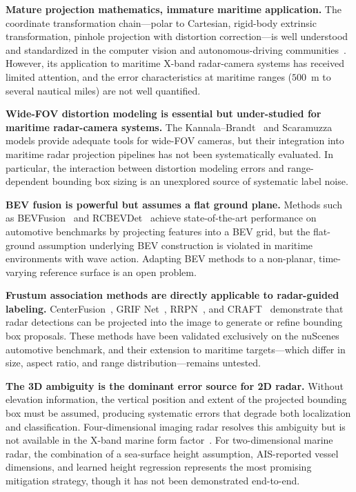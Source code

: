 \textbf{Mature projection mathematics, immature maritime application.} The coordinate transformation chain---polar to Cartesian, rigid-body extrinsic transformation, pinhole projection with distortion correction---is well understood and standardized in the computer vision and autonomous-driving communities~\cite{zhang2000flexible, Caesar2020nuScenes}. However, its application to maritime X-band radar-camera systems has received limited attention, and the error characteristics at maritime ranges ($500$~m to several nautical miles) are not well quantified.

\textbf{Wide-FOV distortion modeling is essential but under-studied for maritime radar-camera systems.} The Kannala--Brandt~\cite{kannala2006generic} and Scaramuzza~\cite{scaramuzza2006toolbox} models provide adequate tools for wide-FOV cameras, but their integration into maritime radar projection pipelines has not been systematically evaluated. In particular, the interaction between distortion modeling errors and range-dependent bounding box sizing is an unexplored source of systematic label noise.

\textbf{BEV fusion is powerful but assumes a flat ground plane.} Methods such as BEVFusion~\cite{liu2023bevfusion} and RCBEVDet~\cite{Lin2024RCBEVDet} achieve state-of-the-art performance on automotive benchmarks by projecting features into a BEV grid, but the flat-ground assumption underlying BEV construction is violated in maritime environments with wave action. Adapting BEV methods to a non-planar, time-varying reference surface is an open problem.

\textbf{Frustum association methods are directly applicable to radar-guided labeling.} CenterFusion~\cite{Nabati2021CenterFusion}, GRIF Net~\cite{Kim2020GRIFNet}, RRPN~\cite{nabati2019rrpn}, and CRAFT~\cite{Kim2022CRAFT} demonstrate that radar detections can be projected into the image to generate or refine bounding box proposals. These methods have been validated exclusively on the nuScenes automotive benchmark, and their extension to maritime targets---which differ in size, aspect ratio, and range distribution---remains untested.

\textbf{The 3D ambiguity is the dominant error source for 2D radar.} Without elevation information, the vertical position and extent of the projected bounding box must be assumed, producing systematic errors that degrade both localization and classification. Four-dimensional imaging radar resolves this ambiguity but is not available in the X-band marine form factor~\cite{meyer2019automotive}. For two-dimensional marine radar, the combination of a sea-surface height assumption, AIS-reported vessel dimensions, and learned height regression represents the most promising mitigation strategy, though it has not been demonstrated end-to-end.


